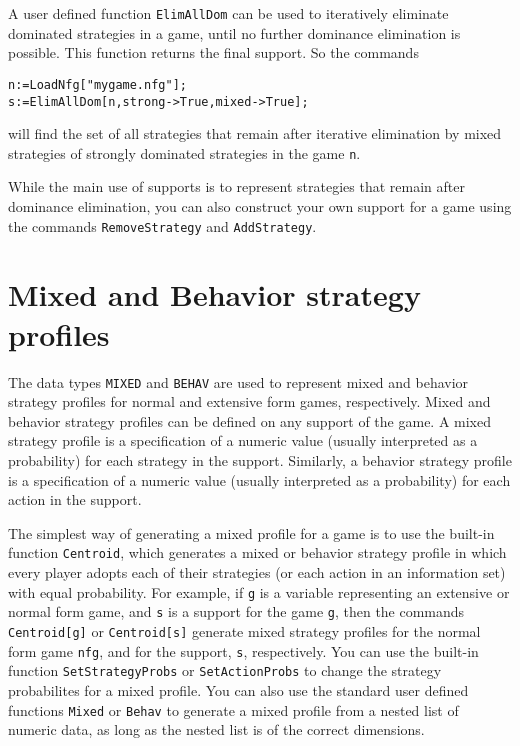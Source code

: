 A user defined function \verb+ElimAllDom+ can be used to iteratively
eliminate dominated strategies in a game, until no further dominance
elimination is possible.  This function returns the final support.  So
the commands

\begin{verbatim}
n:=LoadNfg["mygame.nfg"];
s:=ElimAllDom[n,strong->True,mixed->True];
\end{verbatim}

will find the set of all strategies that remain after iterative
elimination by mixed strategies of strongly dominated strategies in
the game \verb+n+.

While the main use of supports is to represent strategies that
remain after dominance elimination, you can also construct your own
support for a game using the commands \verb+RemoveStrategy+ and
\verb+AddStrategy+.

\section{Mixed and Behavior strategy profiles}

The data types \verb+MIXED+ and \verb+BEHAV+ are used to represent
mixed and behavior strategy profiles for normal and extensive form
games, respectively.  Mixed and behavior strategy profiles can be
defined on any support of the game.  A mixed strategy profile is a
specification of a numeric value (usually interpreted as a
probability) for each strategy in the support.  Similarly, a behavior
strategy profile is a specification of a numeric value (usually
interpreted as a probability) for each action in the support. 

The simplest way of generating a mixed profile for a game is to use
the built-in function \verb+Centroid+, which generates a mixed or
behavior strategy profile in which every player adopts each of their
strategies (or each action in an information set) with equal
probability.  For example, if \verb+g+ is a variable representing an
extensive or normal form game, and \verb+s+ is a support for the game
\verb+g+, then the commands \verb+Centroid[g]+ or \verb+Centroid[s]+
generate mixed strategy profiles for the normal form game \verb+nfg+,
and for the support, \verb+s+, respectively.  You can use the built-in
function \verb+SetStrategyProbs+ or \verb+SetActionProbs+ to change
the strategy probabilites for a mixed profile.  You can also use the
standard user defined functions \verb+Mixed+ or \verb+Behav+ to
generate a mixed profile from a nested list of numeric data, as long
as the nested list is of the correct dimensions.

